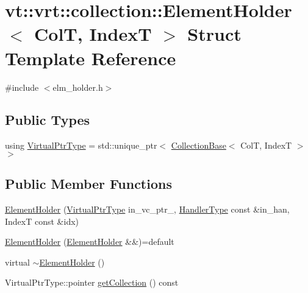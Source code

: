 \hypertarget{structvt_1_1vrt_1_1collection_1_1_element_holder}{}\section{vt\+:\+:vrt\+:\+:collection\+:\+:Element\+Holder$<$ ColT, IndexT $>$ Struct Template Reference}
\label{structvt_1_1vrt_1_1collection_1_1_element_holder}


{\ttfamily \#include $<$elm\+\_\+holder.\+h$>$}

\subsection*{Public Types}
\begin{DoxyCompactItemize}
\item 
using \hyperlink{structvt_1_1vrt_1_1collection_1_1_element_holder_afc12d1a71ec8f735f1b7fe12a067c8a6}{Virtual\+Ptr\+Type} = std\+::unique\+\_\+ptr$<$ \hyperlink{structvt_1_1vrt_1_1collection_1_1_collection_base}{Collection\+Base}$<$ ColT, IndexT $>$ $>$
\end{DoxyCompactItemize}
\subsection*{Public Member Functions}
\begin{DoxyCompactItemize}
\item 
\hyperlink{structvt_1_1vrt_1_1collection_1_1_element_holder_ae0407d670510c0c02141499b28da6d6e}{Element\+Holder} (\hyperlink{structvt_1_1vrt_1_1collection_1_1_element_holder_afc12d1a71ec8f735f1b7fe12a067c8a6}{Virtual\+Ptr\+Type} in\+\_\+vc\+\_\+ptr\+\_\+, \hyperlink{namespacevt_af64846b57dfcaf104da3ef6967917573}{Handler\+Type} const \&in\+\_\+han, IndexT const \&idx)
\item 
\hyperlink{structvt_1_1vrt_1_1collection_1_1_element_holder_acc214e54954edc0d8112c59ea7e51c02}{Element\+Holder} (\hyperlink{structvt_1_1vrt_1_1collection_1_1_element_holder}{Element\+Holder} \&\&)=default
\item 
virtual \hyperlink{structvt_1_1vrt_1_1collection_1_1_element_holder_a04bbd1ceb1c94a4adaedeca1fc6d4acf}{$\sim$\+Element\+Holder} ()
\item 
Virtual\+Ptr\+Type\+::pointer \hyperlink{structvt_1_1vrt_1_1collection_1_1_element_holder_a737123e80d701335e9989bc300b0868b}{get\+Collection} () const
\end{DoxyCompactItemize}
